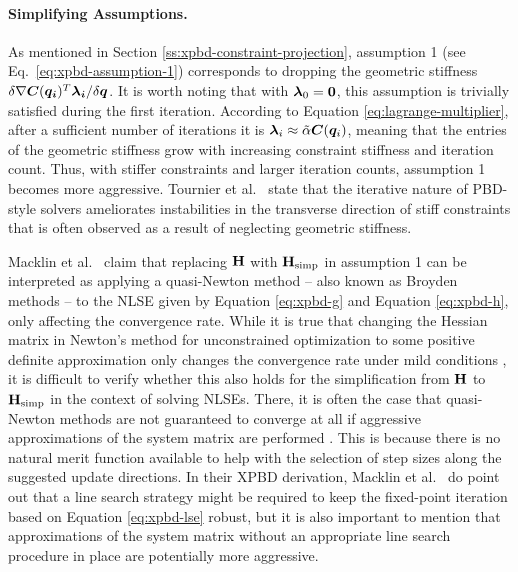\paragraph{Simplifying Assumptions.}
As mentioned in Section \ref{ss:xpbd-constraint-projection}, assumption 1 (see Eq.\ \ref{eq:xpbd-assumption-1}) corresponds to dropping the geometric stiffness 
$\delta \nabla \bm{C}(\bm{q_i})^T \bm{\lambda_i} / \delta \bm{q}$. It is worth noting that with $\bm{\lambda}_0 = \bm{0}$, this assumption is 
trivially satisfied during the first iteration. According to Equation \ref{eq:lagrange-multiplier}, after a sufficient number of iterations it is $\bm{\lambda}_i 
\approx \tilde{\mathbf{\alpha}} \bm{C}(\bm{q}_i)$, meaning that the entries of the geometric stiffness grow with increasing constraint stiffness and iteration
count. Thus, with stiffer constraints and larger iteration counts, assumption 1 becomes more aggressive. Tournier et al.\ \cite{tournier2015} state that
the iterative nature of PBD-style solvers ameliorates instabilities in the transverse direction of stiff constraints that is often observed as a result
of neglecting geometric stiffness.

Macklin et al.\ \cite{macklin2016} claim that replacing $\mathbf{H}$ with $\mathbf{H}_{\text{simp}}$ in assumption 1 can be interpreted as applying a quasi-Newton 
method -- also known as Broyden methods -- to the NLSE given by Equation \ref{eq:xpbd-g} and Equation \ref{eq:xpbd-h}, only affecting the convergence rate. While it is 
true that changing the Hessian 
matrix in Newton's method for unconstrained optimization to some positive definite approximation only changes the convergence rate under mild conditions
\cite{nocedal2006}, it is difficult to verify whether this also holds for the simplification from $\mathbf{H}$ to $\mathbf{H}_{\text{simp}}$ in the context of
solving NLSEs. There, it is often the case that quasi-Newton methods are not guaranteed to converge at all if aggressive approximations
of the system matrix are performed \cite{nocedal2006}. This is because there is no natural merit function available to help with the selection of 
step sizes along the suggested update directions. In their XPBD derivation, Macklin et al.\ \cite{macklin2016} do
point out that a line search strategy might be required to keep the fixed-point iteration based on Equation \ref{eq:xpbd-lse} robust, but it is also important
to mention that approximations of the system matrix without an appropriate line search procedure in place are potentially more aggressive.

